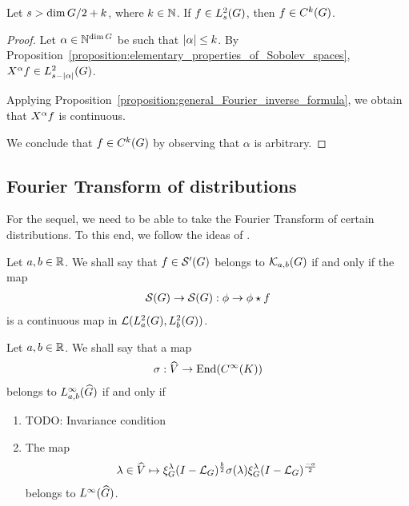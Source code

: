 \begin{corollary}
    Let $s > \dim \Group / 2 + k$, where $k \in \N$.
    If $f \in \Sobolev s$,
    then $f \in \Class k$.
\end{corollary}
\begin{proof}
    Let $\alpha \in \N^{\dim \Group}$ be such that $\abs \alpha \leq k$.
    By Proposition~\ref{proposition:elementary_properties_of_Sobolev_spaces},
    $\LeftDifferentialOperator \alpha f \in \Sobolev {s - \abs \alpha}$.

    Applying Proposition~\ref{proposition:general_Fourier_inverse_formula},
    we obtain that $\LeftDifferentialOperator \alpha f$ is continuous.

    We conclude that $f \in \Class k$ by observing that $\alpha$ is arbitrary.
\end{proof}

\subsection{Fourier Transform of distributions}

For the sequel, we need to be able to take the Fourier Transform of certain distributions.
To this end, we follow the ideas of \cite{FischerRuzhansky16}.

\begin{definition}
    Let $a, b \in \R$.
    We shall say that $f \in \TemperedDistributions\Group$ belongs to $\KernelsSobolev{a}{b}$ if and only if the map
    \begin{align*}
        \Schwartz\Group \to \Schwartz\Group : \phi \to \conv{\phi}{f}
    \end{align*}
    is a continuous map in $\Lin{\Sobolev{a}, \Sobolev{b}}$.
\end{definition}

\begin{definition}
    Let $a, b \in \R$.
    We shall say that a map
    \begin{align*}
        \sigma : \dualGroup\VectorSpace \to \End(\SmoothFunctions{\CompactGroup})
    \end{align*}
    belongs to $\LebesgueDual[a, b]{\infty}{\Group}$ if and only if
    \begin{enumerate}
        \item TODO: Invariance condition
        \item The map
            \begin{align*}
                \lambda \in \dualGroup\VectorSpace \mapsto
                \Rep\lambda \BesselPotential{b} \sigma(\lambda) \Rep\lambda \BesselPotential{-a}
            \end{align*}
            belongs to $\LebesgueDual{\infty}{\Group}$.
    \end{enumerate}
\end{definition}

